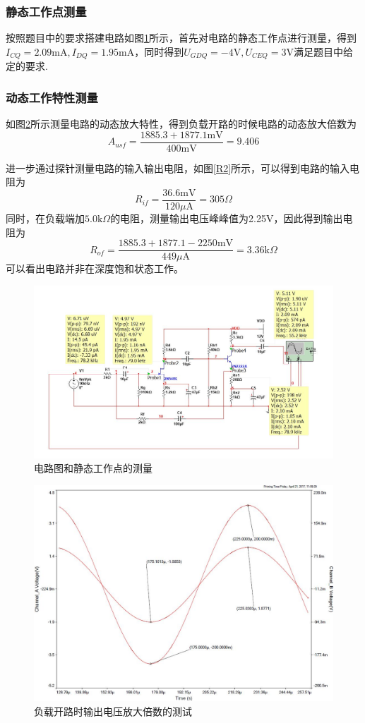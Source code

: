 \documentclass[UTF8,a4paper]{article}
\begin{document}
\subsubsection{静态工作点测量}
按照题目中的要求搭建电路如图\ref{Q2}所示，首先对电路的静态工作点进行测量，得到$I_{CQ}=2.09\mathrm{mA},I_{DQ}=1.95\mathrm{mA}$，同时得到$U_{GDQ}=-4\mathrm{V},U_{CEQ}=3\mathrm{V}$满足题目中给定的要求.
\subsubsection{动态工作特性测量}
如图\ref{A2}所示测量电路的动态放大特性，得到负载开路的时候电路的动态放大倍数为$$A_{usf}=\frac{1885.3+1877.1\mathrm{mV}}{400\mathrm{mV}}=9.406$$

进一步通过探针测量电路的输入输出电阻，如图\ref{R2}所示，可以得到电路的输入电阻为
$$R_{if}=\frac{36.6\mathrm{mV}}{120\mu\mathrm{A}}=305\Omega$$
同时，在负载端加$5.0\mathrm{k}\Omega$的电阻，测量输出电压峰峰值为2.25V，因此得到输出电阻为
$$R_{of}=\frac{1885.3+1877.1-2250\mathrm{mV}}{449\mu\mathrm{A}}=3.36\mathrm{k}\Omega$$可以看出电路并非在深度饱和状态工作。
\begin{figure}
\centering
\includegraphics[width=\textwidth]{Q2.jpg}
\caption{电路图和静态工作点的测量}
\label{Q2}
\end{figure}
\begin{figure}
\centering
\includegraphics[width=\textwidth]{A2.jpg}
\caption{负载开路时输出电压放大倍数的测试}
\label{A2}
\end{figure}
\end{document}
